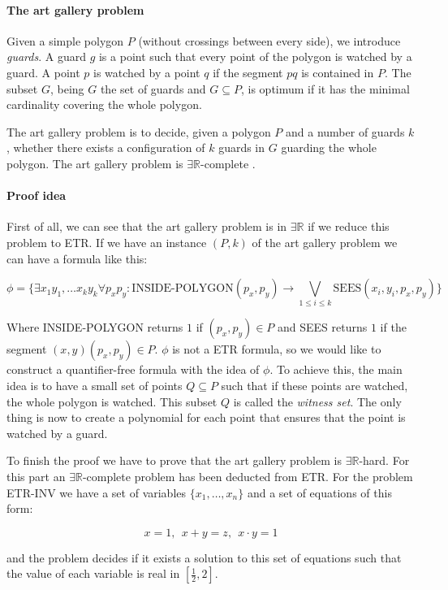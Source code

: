 \paragraph{The art gallery problem} Given a simple polygon $P$ (without
crossings between every side), we introduce \textit{guards}. A guard
$g$ is a point such that every point of the polygon is watched by a guard.
A point $p$ is watched by a point $q$ if the segment $pq$ is contained
in $P$. The subset $G$, being $G$ the set of guards and $G \subseteq
P$, is optimum if it has the minimal cardinality covering the whole
polygon.

The art gallery problem is to decide, given a polygon $P$ and a number of
guards $k$, whether there exists a configuration of $k$ guards in $G$
guarding the whole polygon. The art gallery problem is $\exists
\mathbb{R}$-complete \cite{abrahamsenArtGalleryProblem2017}.

\paragraph{Proof idea} First of all, we can see that the art gallery problem
is in $\exists \mathbb{R}$ if we reduce this problem to ETR. If we have an
instance $(P,k)$ of the art gallery problem we can have a formula
\cite{EFRAT2006238} like this:

$$\phi = \{\exists x_1y_1,\dots x_ky_k \forall p_xp_y :
\text{INSIDE-POLYGON}(p_x,p_y) \to \bigvee_{1 \leq i \leq k}
\text{SEES}(x_i,y_i,p_x,p_y)\}$$

Where INSIDE-POLYGON returns $1$ if $(p_x,p_y) \in P$ and SEES returns $1$ if
the segment $(x,y)(p_x,p_y) \in P$. $\phi$ is not a ETR formula, so we would like
to construct a quantifier-free formula with the idea of $\phi$. To achieve this,
the main idea is to have a small set of points $Q \subseteq P$ such that if these
points are watched, the whole polygon is watched. This subset $Q$ is called
the \textit{witness set}. The only thing is now to create a polynomial for each
point that ensures that the point is watched by a guard.

To finish the proof we have to prove that the art gallery problem is $\exists
\mathbb{R}$-hard. For this part an $\exists \mathbb{R}$-complete
problem has been deducted from ETR. For the problem ETR-INV we have a set of
variables $\{x_1,\dots,x_n\}$ and a set of equations of this form:

$$x = 1,\ \ x + y = z,\ \ x \cdot y = 1 $$

and the problem decides if it exists a solution to this set of equations such
that the value of each variable is real in $[\frac{1}{2},2]$.

